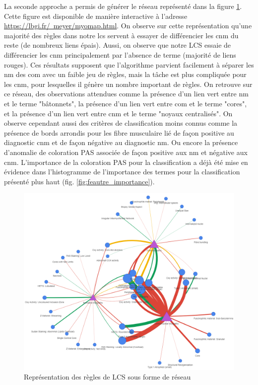 La seconde approche a permis de générer le réseau représenté dans la figure \ref{fig:network}. Cette figure est disponible de manière interactive à l'adresse \href{https://lbgi.fr/~meyer/myomap.html}{https://lbgi.fr/~meyer/myomap.html}. On observe sur cette représentation qu'une majorité des règles dans notre \gls{lcs} servent à essayer de différencier les \gls{cnm} du reste (de nombreux liens épais). Aussi, on observe que notre LCS essaie de différencier les \gls{cnm} principalement par l'absence de terme (majorité de liens rouges). Ces résultats supposent que l'algorithme parvient facilement à séparer les \gls{nm} des \gls{com} avec un faible jeu de règles, mais la tâche est plus compliquée pour les \gls{cnm}, pour lesquelles il génère un nombre important de règles. On retrouve sur ce réseau, des observations attendues comme la présence d'un lien vert entre \gls{nm} et le terme "bâtonnets", la présence d'un lien vert entre \gls{com} et le terme "cores", et la présence d'un lien vert entre \gls{cnm} et le terme "noyaux centralisés". On observe cependant aussi des critères de classification moins connus comme la présence de bords arrondis pour les fibre musculaire lié de façon positive au diagnostic \gls{cnm} et de façon négative au diagnostic \gls{nm}. Ou encore la présence d'anomalie de coloration PAS associée de façon positive aux \gls{nm} et négative aux \gls{cnm}. L'importance de la coloration PAS pour la classification a déjà été mise en évidence dans l'histogramme de l'importance des termes pour la classification présenté plus haut (fig. \ref{fig:feautre_importance}).
\begin{figure}[htbp]
  \centering
  \includegraphics[width=1\textwidth]{figures/network_lcs.png}
  \caption[Représentation des règles de LCS sous forme de réseau]{Représentation des règles de LCS sous forme de réseau}
  \label{fig:network}
\end{figure}
